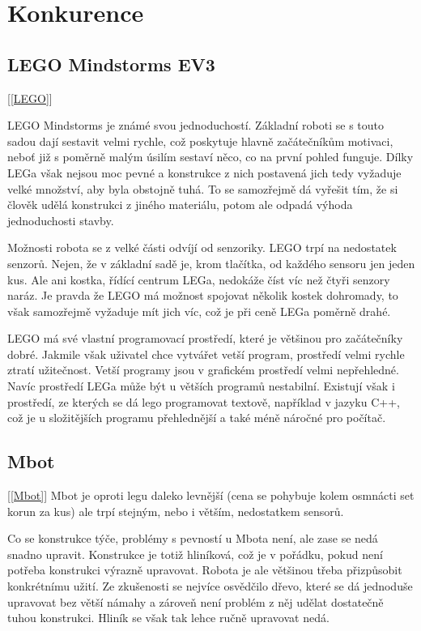 \documentclass{template/socthesis}
\begin{document}

\section{Konkurence} \label{konkurence}

\subsection{LEGO Mindstorms EV3}[\ref{LEGO}]

LEGO Mindstorms je známé svou jednoduchostí. Základní roboti se s touto sadou dají sestavit velmi rychle, což poskytuje hlavně začátečníkům motivaci, neboť již s poměrně malým úsilím sestaví něco, co na první pohled funguje. Dílky LEGa však nejsou moc pevné a konstrukce z nich postavená jich tedy vyžaduje velké množství, aby byla obstojně tuhá. To se samozřejmě dá vyřešit tím, že si člověk udělá konstrukci z jiného materiálu, potom ale odpadá výhoda jednoduchosti stavby.

Možnosti robota se z velké části odvíjí od senzoriky. LEGO trpí na nedostatek senzorů. Nejen, že v základní sadě je, krom tlačítka, od každého sensoru jen jeden kus. Ale ani kostka, řídící centrum LEGa, nedokáže číst víc než čtyři senzory naráz. Je pravda že LEGO má možnost spojovat několik kostek dohromady, to však samozřejmě vyžaduje mít jich víc, což je při ceně LEGa poměrně drahé.


LEGO má své vlastní programovací prostředí, které je většinou pro začátečníky dobré. Jakmile však uživatel chce vytvářet vetší program, prostředí velmi rychle ztratí užitečnost. Vetší programy jsou v grafickém prostředí velmi nepřehledné. Navíc prostředí LEGa může být u větších programů nestabilní. Existují však i prostředí, ze kterých se dá lego programovat textově, například v jazyku C++, což je u složitějších programu přehlednější a také méně náročné pro počítač.

\subsection{Mbot} [\ref{Mbot}]
Mbot je oproti legu daleko levnější (cena se pohybuje kolem osmnácti set korun za kus) ale trpí stejným, nebo i větším, nedostatkem sensorů. 

Co se konstrukce týče, problémy s pevností u Mbota není, ale zase se nedá snadno upravit. Konstrukce je totiž hliníková, což je v pořádku, pokud není potřeba konstrukci výrazně upravovat. Robota je ale většinou třeba přizpůsobit konkrétnímu užití.
 Ze zkušenosti se nejvíce osvědčilo dřevo, které se dá jednoduše upravovat bez větší námahy a zároveň není problém z něj udělat dostatečně tuhou konstrukci. Hliník se však tak lehce ručně upravovat nedá.
 
\end{document}
